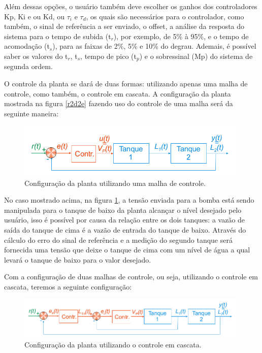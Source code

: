 \documentclass[a4paper,12pt]{article}
\begin{document}
\hspace{4ex}Além dessas opções, o usuário também deve escolher os ganhos dos controladores Kp, Ki e ou Kd, ou $\tau_i$ e $\tau_d$, os quais são necessários para o controlador, como também, o  sinal de referência a ser enviado, o offset, a análise da resposta do sistema para o tempo de subida (t$_r$), por exemplo, de 5\% à 95\%, e o tempo de acomodação (t$_s$), para as faixas de 2\%, 5\% e 10\% do degrau. Ademais, é possível saber os valores do  t$_r$, t$_s$, tempo de pico (t$_p$) e o sobressinal (Mp) do sistema de segunda ordem.

\hspace{4ex}O controle da planta se dará de duas formas: utilizando apenas uma malha de controle, como também, o controle em cascata. A configuração da planta mostrada na figura \ref{r2d2e} fazendo uso do controle de uma malha será da seguinte maneira:

\begin{figure}[H]
\centering
\includegraphics[width=11cm]{ImagensLab4/umamalha.png}
\caption{Configuração da planta utilizando uma malha de controle.}
\label{umamalha}
\end{figure}

\hspace{4ex}No caso mostrado acima, na figura \ref{umamalha}, a tensão enviada para a bomba está sendo manipulada para o tanque de baixo da planta alcançar o nível desejado pelo usuário, isso é possível por causa da relação entre os dois tanques: a vazão de saída do tanque de cima é a vazão de entrada do tanque de baixo. Através do cálculo do erro do sinal de referência e a medição do segundo tanque será fornecida uma tensão que deixe o tanque de cima com um nível de água a qual levará o tanque de baixo para o valor desejado.

\hspace{4ex}Com a configuração de duas malhas de controle, ou seja, utilizando o controle em cascata, teremos a seguinte configuração:

\begin{figure}[H]
\centering
\includegraphics[width=11cm]{ImagensLab4/duasmalhas.png}
\caption{Configuração da planta utilizando o controle em cascata.}
\label{duasmalha}
\end{figure}
\end{document}
